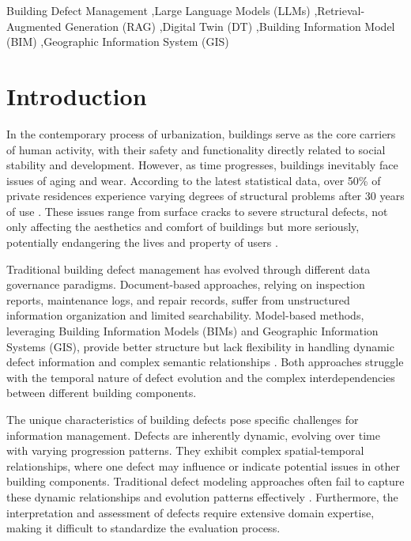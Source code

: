 \documentclass[a4paper,fleqn]{cas-sc}
\begin{document}
\begin{keywords}
Building Defect Management \sep Large Language Models (LLMs) \sep Retrieval-Augmented Generation (RAG) \sep Digital Twin (DT) \sep Building Information Model (BIM) \sep Geographic Information System (GIS)
\end{keywords}

\maketitle

\section{Introduction}

In the contemporary process of urbanization, buildings serve as the core carriers of human activity, with their safety and functionality directly related to social stability and development. However, as time progresses, buildings inevitably face issues of aging and wear. According to the latest statistical data, over 50\% of private residences experience varying degrees of structural problems after 30 years of use \cite{spencer2019advances}. These issues range from surface cracks to severe structural defects, not only affecting the aesthetics and comfort of buildings but more seriously, potentially endangering the lives and property of users \cite{zhang2023automated}.

Traditional building defect management has evolved through different data governance paradigms. Document-based approaches, relying on inspection reports, maintenance logs, and repair records, suffer from unstructured information organization and limited searchability. Model-based methods, leveraging Building Information Models (BIMs) and Geographic Information Systems (GIS), provide better structure but lack flexibility in handling dynamic defect information and complex semantic relationships \cite{li2024single}. Both approaches struggle with the temporal nature of defect evolution and the complex interdependencies between different building components.

The unique characteristics of building defects pose specific challenges for information management. Defects are inherently dynamic, evolving over time with varying progression patterns. They exhibit complex spatial-temporal relationships, where one defect may influence or indicate potential issues in other building components. Traditional defect modeling approaches often fail to capture these dynamic relationships and evolution patterns effectively \cite{wang2023augmented}. Furthermore, the interpretation and assessment of defects require extensive domain expertise, making it difficult to standardize the evaluation process.
\end{document}
